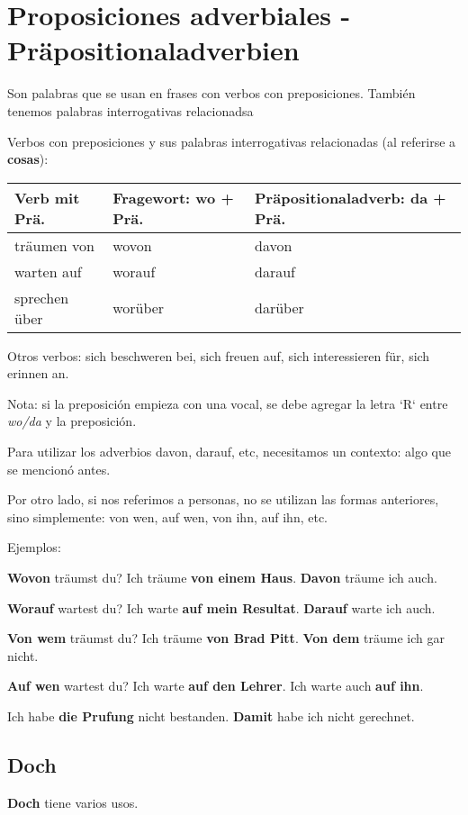 \section{Proposiciones adverbiales - Präpositionaladverbien}
Son palabras que se usan en frases con verbos con preposiciones. También tenemos palabras interrogativas relacionadsa

Verbos con preposiciones y sus palabras interrogativas relacionadas (al referirse a \textbf{cosas}):

\begin{tabular}{| l | l | l |}
\hline
\textbf{Verb mit Prä.} & \textbf{Fragewort: wo + Prä.} & \textbf{Präpositionaladverb: da + Prä.}\\
\hline
träumen von & wovon & davon \\
warten auf & worauf & darauf \\
sprechen über & worüber & darüber\\
\hline
\end{tabular}

Otros verbos: sich beschweren bei, sich freuen auf, sich interessieren für, sich erinnen an.

Nota: si la preposición empieza con una vocal, se debe agregar la letra `R` entre \textit{wo/da} y la preposición. 

Para utilizar los adverbios davon, darauf, etc, necesitamos un contexto: algo que se mencionó antes. 

Por otro lado, si nos referimos a personas, no se utilizan las formas anteriores, sino simplemente: von wen, auf wen, von ihn, auf ihn, etc.

Ejemplos:

\textbf{Wovon} träumst du? Ich träume \textbf{ von einem Haus}. \textbf{Davon} träume ich auch.

\textbf{Worauf} wartest du? Ich warte \textbf{auf mein Resultat}. \textbf{Darauf} warte ich auch.

\textbf{Von wem} träumst du? Ich träume \textbf{von Brad Pitt}. \textbf{Von dem} träume ich gar nicht.

\textbf{Auf wen} wartest du? Ich warte \textbf{auf den Lehrer}. Ich warte auch \textbf{auf ihn}.

Ich habe \textbf{die Prufung} nicht bestanden. \textbf{Damit} habe ich nicht gerechnet.

\subsection{Doch}
\textbf{Doch} tiene varios usos.

